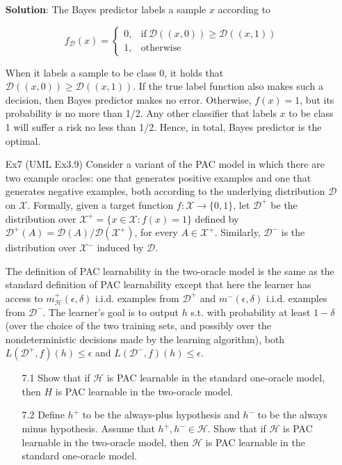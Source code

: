 \documentclass{article}
\begin{document}
\begin{itemize}
\begin{itemize}
\item[] \textbf{Solution}: The Bayes predictor labels a sample $x$ according to

	\begin{equation*}
	f_\mathcal{D}(x) = \left\{
	\begin{matrix} 0,& \mathrm{if}\ \mathcal{D}((x,0))\geq \mathcal{D}((x,1)) \\ 1,& \mathrm{otherwise} 
	\end{matrix}\right.
	\end{equation*}
	
	When it labels a sample to be class 0, it holds that $\mathcal{D}((x,0))\geq \mathcal{D}((x,1))$. If the true label function also makes such a decision, then Bayes predictor makes no error. Otherwise, $f(x)=1$, but its probability is no more than 1/2. Any other classifier that labels $x$ to be class 1 will suffer a risk no less than 1/2. Hence, in total, Bayes predictor is the optimal.

\item[Ex7] (UML Ex3.9) Consider a variant of the PAC model in which there are two example oracles: one that generates positive examples and one that generates negative examples, both according to the underlying distribution $\mathcal{D}$ on $\mathcal{X}$. Formally, given a target function $f: \mathcal{X}\rightarrow\{0,1\}$, let $\mathcal{D}^+$ be the distribution over $\mathcal{X}^+ = \{x\in\mathcal{X}: f(x)= 1\}$ defined by $\mathcal{D}^+(A) = \mathcal{D}(A)/\mathcal{D}(\mathcal{X}^+)$, for every $A\in\mathcal{X}^+$. Similarly, $\mathcal{D}^-$ is the distribution over $\mathcal{X}^-$ induced by $\mathcal{D}$. 
	
	The definition of PAC learnability in the two-oracle model is the same as the standard definition of PAC learnability except that here the learner has access to $m_\mathcal{H}^+(\epsilon, \delta)$  i.i.d. examples from $\mathcal{D}^+$ and $m^-(\epsilon, \delta)$ i.i.d. examples from $\mathcal{D}^-$. The learner's goal is to output $h$ s.t. with probability at least $1-\delta$ (over the choice of the two training sets, and possibly over the nondeterministic decisions made by the learning algorithm), both $L(\mathcal{D}^+, f)(h)\leq\epsilon$ and $L(\mathcal{D}^-, f)(h)\leq\epsilon$.
	\begin{itemize}
	\item[7.1] Show that if $\mathcal{H}$ is PAC learnable in the standard one-oracle model, then $H$ is PAC learnable in the two-oracle model.
	\item[7.2] Define $h^+$ to be the always-plus hypothesis and $h^-$ to be the always minus hypothesis. Assume that $h^+, h^-\in \mathcal{H}$. Show that if $\mathcal{H}$ is PAC learnable in the two-oracle model, then $\mathcal{H}$ is PAC learnable in the standard one-oracle model.
	\end{itemize}
	

\end{itemize}
\end{itemize}
\end{document}
